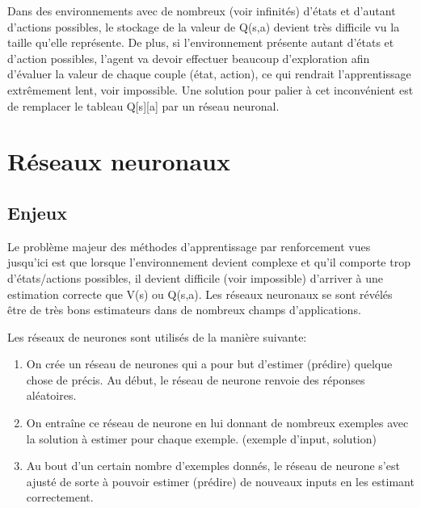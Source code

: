 \documentclass[11pt,a4paper]{report}
\begin{document}
   \par Dans des environnements avec de nombreux (voir infinités) d'états et d'autant d'actions possibles, le stockage de la valeur de Q(s,a) devient très difficile vu la taille qu'elle représente. De plus, si l'environnement présente autant d'états et d'action possibles, l'agent va devoir effectuer beaucoup d'exploration afin d'évaluer la valeur de chaque couple (état, action), ce qui rendrait l'apprentissage extrêmement lent, voir impossible. Une solution pour palier à cet inconvénient est de remplacer le tableau Q[s][a] par un réseau neuronal. 
   
  \section{Réseaux neuronaux}
  
  \subsection{Enjeux}
  
      \par Le problème majeur des méthodes d'apprentissage par renforcement vues jusqu'ici est que lorsque l'environnement devient complexe et qu'il comporte trop d'états/actions possibles, il devient difficile (voir impossible) d'arriver à une estimation correcte que V(s) ou Q(s,a). Les réseaux neuronaux se sont révélés être de très bons estimateurs dans de nombreux champs d'applications. 
      
      \par Les réseaux de neurones sont utilisés de la manière suivante:
      
      \begin{enumerate}
      \item On crée un réseau de neurones qui a pour but d'estimer (prédire) quelque chose de précis. Au début, le réseau de neurone renvoie des réponses aléatoires. 
      \item On entraîne ce réseau de neurone en lui donnant de nombreux exemples avec la solution à estimer pour chaque exemple. (exemple d'input, solution)
      \item Au bout d'un certain nombre d'exemples donnés, le réseau de neurone s'est ajusté de sorte à pouvoir estimer (prédire) de nouveaux inputs en les estimant correctement. 
      \end{enumerate}  
      
\end{document}
